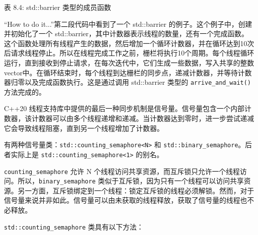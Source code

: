 \begin{center}
表 8.4: std::barrier 类型的成员函数
\end{center}

“How to do it...”第二段代码中看到了一个 std::barrier 的例子。这个例子中，创建并初始化了一个 std::barrier，其中计数器表示线程的数量，还有一个完成函数。这个函数处理所有线程产生的数据，然后增加一个循环计数器，并在循环达到10次后请求线程停止。所以在线程完成工作之前，栅栏将执行10个周期。每个线程循环运行，直到接收到停止请求，在每次迭代中，它们生成一些数据，写入共享的整数vector中。在循环结束时，每个线程到达栅栏的同步点，递减计数器，并等待计数器归零以及完成函数执行。这是通过调用 std::barrier 类型的 \verb|arrive_and_wait()| 方法完成的。

C++20 线程支持库中提供的最后一种同步机制是信号量。信号量包含一个内部计数器，该计数器可以由多个线程递增和递减。当计数器达到零时，进一步尝试递减它会导致线程阻塞，直到另一个线程增加了计数器。

有两种信号量类：\verb|std::counting_semaphore<N>| 和 \verb|std::binary_semaphore|。后者实际上是 \verb|std::counting_semaphore<1>| 的别名。

\verb|counting_semaphore| 允许 N 个线程访问共享资源，而互斥锁只允许一个线程访问。所以，\verb|binary_semaphore| 类似于互斥锁，因为只有一个线程可以访问共享资源。另一方面，互斥锁绑定到一个线程：锁定互斥锁的线程必须解锁。然而，对于信号量来说并非如此。信号量可以由未获取的线程释放，获取了信号量的线程也不必释放。

\verb|std::counting_semaphore| 类具有以下方法：

